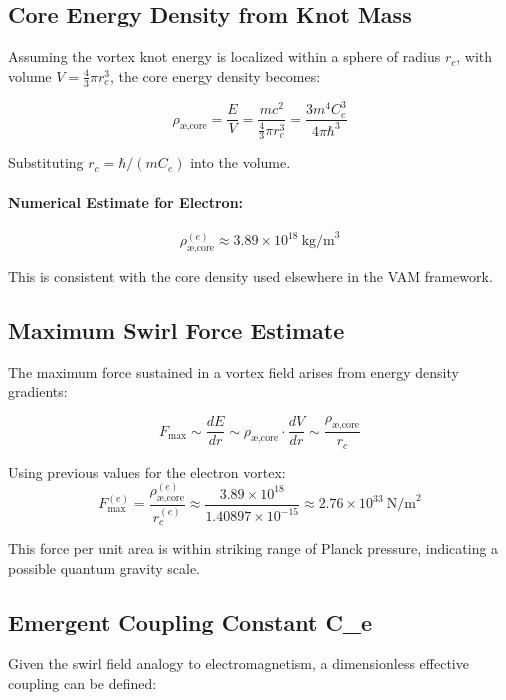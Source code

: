 \subsection{ Core Energy Density from Knot Mass}

Assuming the vortex knot energy is localized within a sphere of radius $r_c$, with volume $V = \frac{4}{3} \pi r_c^3$, the core energy density becomes:

\begin{equation}
\rho_{\text{\ae,core}} = \frac{E}{V} = \frac{m c^2}{\frac{4}{3} \pi r_c^3} = \frac{3 m^4 C_e^3}{4 \pi \hbar^3}
\end{equation}

Substituting $r_c = \hbar / (m C_e)$ into the volume.


\paragraph{Numerical Estimate for Electron:}
\begin{equation}
\rho_{\text{\ae,core}}^{(e)} \approx 3.89 \times 10^{18} \ \text{kg/m}^3
\end{equation}

This is consistent with the core density used elsewhere in the VAM framework.

\subsection{ Maximum Swirl Force Estimate}
The maximum force sustained in a vortex field arises from energy density gradients:

\begin{equation}
F_{\max} \sim \frac{dE}{dr} \sim \rho_{\text{\ae,core}} \cdot \frac{dV}{dr} \sim \frac{\rho_{\text{\ae,core}}}{r_c}
\end{equation}

Using previous values for the electron vortex:
\begin{equation}
F_{\max}^{(e)} = \frac{\rho_{\text{\ae,core}}^{(e)}}{r_c^{(e)}} \approx \frac{3.89 \times 10^{18}}{1.40897 \times 10^{-15}} \approx 2.76 \times 10^{33} \ \text{N/m}^2
\end{equation}

This force per unit area is within striking range of Planck pressure, indicating a possible quantum gravity scale.

\subsection{ Emergent Coupling Constant C_e}
Given the swirl field analogy to electromagnetism, a dimensionless effective coupling can be defined:

